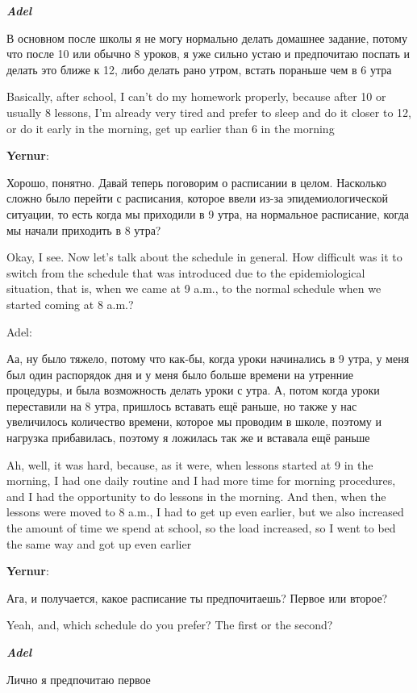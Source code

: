\textbf{\textit{Adel}}

В основном после школы я не могу нормально делать домашнее задание, потому что после 10 или обычно 8 уроков, я уже сильно устаю и предпочитаю поспать и делать это ближе к 12, либо делать рано утром, встать пораньше чем в 6 утра

Basically, after school, I can't do my homework properly, because after 10 or usually 8 lessons, I'm already very tired and prefer to sleep and do it closer to 12, or do it early in the morning, get up earlier than 6 in the morning

\textbf{Yernur}: 

Хорошо, понятно. Давай теперь поговорим о расписании в целом. Насколько сложно было перейти с расписания, которое ввели из-за эпидемиологической ситуации, то есть когда мы приходили в 9 утра, на нормальное расписание, когда мы начали приходить в 8 утра?

Okay, I see. Now let's talk about the schedule in general. How difficult was it to switch from the schedule that was introduced due to the epidemiological situation, that is, when we came at 9 a.m., to the normal schedule when we started coming at 8 a.m.?

Adel:

Аа, ну было тяжело, потому что как-бы, когда уроки начинались в 9 утра, у меня был один распорядок дня и у меня было больше времени на утренние процедуры, и была возможность делать уроки с утра. А, потом когда уроки переставили на 8 утра, пришлось вставать ещё раньше, но также у нас увеличилось количество времени, которое мы проводим в школе, поэтому и нагрузка прибавилась, поэтому я ложилась так же и вставала ещё раньше

Ah, well, it was hard, because, as it were, when lessons started at 9 in the morning, I had one daily routine and I had more time for morning procedures, and I had the opportunity to do lessons in the morning. And then, when the lessons were moved to 8 a.m., I had to get up even earlier, but we also increased the amount of time we spend at school, so the load increased, so I went to bed the same way and got up even earlier

\textbf{Yernur}:

Ага, и получается, какое расписание ты предпочитаешь? Первое или второе?

Yeah, and, which schedule do you prefer? The first or the second?

\textbf{\textit{Adel}}

Лично я предпочитаю первое

